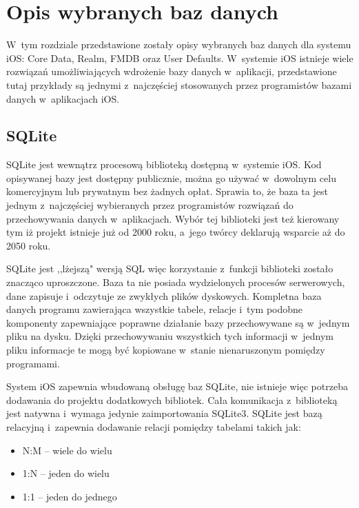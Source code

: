 \section{Opis wybranych baz danych}

 W~tym rozdziale przedstawione zostały opisy wybranych baz danych dla systemu iOS: Core Data, Realm, FMDB oraz User Defaults. W~systemie iOS istnieje wiele rozwiązań umożliwiających wdrożenie bazy danych w~aplikacji, przedstawione tutaj przykłady są jednymi z~najczęściej stosowanych przez programistów bazami danych w~aplikacjach iOS.

\subsection{SQLite}
SQLite jest wewnątrz procesową biblioteką dostępną w~systemie iOS. Kod opisywanej bazy jest dostępny publicznie, można go używać w~dowolnym celu komercyjnym lub prywatnym bez żadnych opłat. Sprawia to, że baza ta jest jednym z~najczęściej wybieranych przez programistów rozwiązań do przechowywania danych w~aplikacjach. Wybór tej biblioteki jest też kierowany tym iż projekt istnieje już od 2000 roku, a~jego twórcy deklarują wsparcie aż do 2050 roku\cite{SQLite-doc}.\par

SQLite jest ,,lżejszą" wersją SQL więc korzystanie z~funkcji biblioteki zostało znacząco uproszczone. Baza ta nie posiada wydzielonych procesów serwerowych, dane zapisuje i~odczytuje ze zwykłych plików dyskowych. Kompletna baza danych programu zawierająca wszystkie tabele, relacje i~tym podobne komponenty zapewniające poprawne działanie bazy przechowywane są w~jednym pliku na dysku. Dzięki przechowywaniu wszystkich tych informacji w~jednym pliku informacje te mogą być kopiowane w~stanie nienaruszonym pomiędzy programami.\par

System iOS zapewnia wbudowaną obsługę baz SQLite, nie istnieje więc potrzeba dodawania do projektu dodatkowych bibliotek. Cała komunikacja z~biblioteką jest natywna i~wymaga jedynie zaimportowania SQLite3\cite{SQLite-doc}. 
SQLite jest bazą relacyjną i~zapewnia dodawanie relacji pomiędzy tabelami takich jak: 

\begin{itemize}
  \item N:M – wiele do wielu
  \item 1:N – jeden do wielu
  \item 1:1 – jeden do jednego 
\end{itemize}

